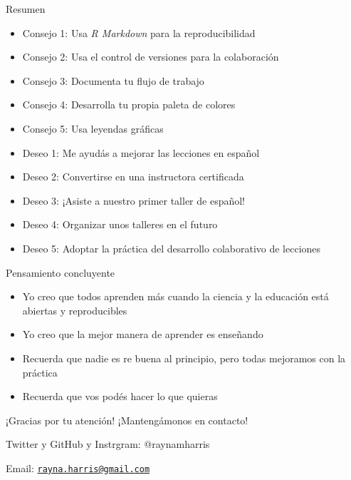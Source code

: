 \documentclass[ignorenonframetext,]{beamer}
\providecommand{\tightlist}{%
  \setlength{\itemsep}{0pt}\setlength{\parskip}{0pt}}
\begin{document}
\begin{frame}{Resumen}

\begin{itemize}
\item
  Consejo 1: Usa \emph{R Markdown} para la reproducibilidad
\item
  Consejo 2: Usa el control de versiones para la colaboración
\item
  Consejo 3: Documenta tu flujo de trabajo
\item
  Consejo 4: Desarrolla tu propia paleta de colores
\item
  Consejo 5: Usa leyendas gráficas
\item
  Deseo 1: Me ayudás a mejorar las lecciones en español
\item
  Deseo 2: Convertirse en una instructora certificada
\item
  Deseo 3: ¡Asiste a nuestro primer taller de español!
\item
  Deseo 4: Organizar unos talleres en el futuro
\item
  Deseo 5: Adoptar la práctica del desarrollo colaborativo de lecciones
\end{itemize}

\end{frame}

\begin{frame}{Pensamiento concluyente}

\begin{itemize}[<+->]
\tightlist
\item
  Yo creo que todos aprenden más cuando la ciencia y la educación está
  abiertas y reproducibles
\item
  Yo creo que la mejor manera de aprender es enseñando
\item
  Recuerda que nadie es re buena al principio, pero todas mejoramos con
  la práctica
\item
  Recuerda que vos podés hacer lo que quieras
\end{itemize}

\end{frame}

\begin{frame}{¡Gracias por tu atención! ¡Mantengámonos en contacto!}

Twitter y GitHub y Instrgram: @raynamharris

Email:
\href{mailto:rayna.harris@gmail.com}{\nolinkurl{rayna.harris@gmail.com}}

\end{frame}
\end{document}
